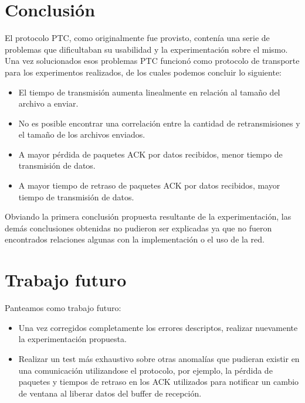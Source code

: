 \documentclass[a4paper, 10pt, twoside]{article}
\begin{document}


\section{Conclusión}

El protocolo PTC, como originalmente fue provisto, contenía una serie de problemas que dificultaban su usabilidad y la experimentación sobre el mismo. Una vez solucionados esos problemas PTC funcionó como protocolo de transporte para los experimentos realizados, de los cuales podemos concluir lo siguiente:

\begin{itemize}
  \item El tiempo de transmisión aumenta linealmente en relación al tamaño del archivo a enviar.

  \item No es posible encontrar una correlación entre la cantidad de retransmisiones y el tamaño de los archivos enviados.

  \item A mayor pérdida de paquetes ACK por datos recibidos, menor tiempo de transmisión de datos.

  \item A mayor tiempo de retraso de paquetes ACK por datos recibidos, mayor tiempo de transmisión de datos.
\end{itemize}

Obviando la primera conclusión propuesta resultante de la experimentación, las demás conclusiones obtenidas no pudieron ser explicadas ya que no fueron encontrados relaciones algunas con la implementación o el uso de la red.




\section{Trabajo futuro}

Panteamos como trabajo futuro:

\begin{itemize}
  \item Una vez corregidos completamente los errores descriptos, realizar nuevamente la experimentación propuesta.

  \item Realizar un test más exhaustivo sobre otras anomalías que pudieran existir en una comunicación utilizandose el protocolo, por ejemplo, la pérdida de paquetes y tiempos de retraso en los ACK utilizados para notificar un cambio de ventana al liberar datos del buffer de recepción.
\end{itemize}




\begin{thebibliography}{9}


\end{thebibliography}
\end{document}
